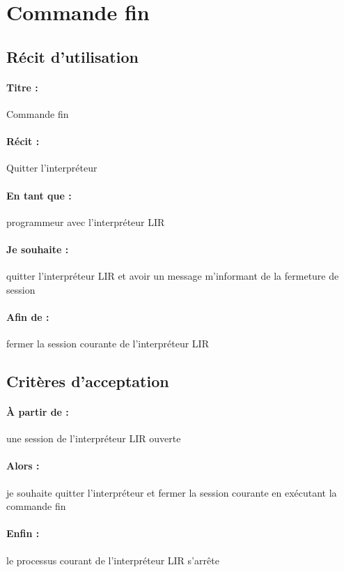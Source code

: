    \section{Commande fin}

\subsection*{Récit d'utilisation}

\paragraph{Titre : } Commande fin
\paragraph{Récit : } Quitter l'interpréteur
\paragraph{En tant que : } programmeur avec l'interpréteur LIR
\paragraph{Je souhaite : } quitter l'interpréteur LIR et avoir un message
m'informant de la fermeture de session
\paragraph{Afin de : } fermer la session courante de l'interpréteur LIR

\subsection*{Critères d'acceptation}

\paragraph{À partir de : } une session de l'interpréteur LIR ouverte
\paragraph{Alors : } je souhaite quitter l'interpréteur et fermer la session
courante en exécutant la commande fin
\paragraph{Enfin : } le processus courant de l'interpréteur LIR s'arrête